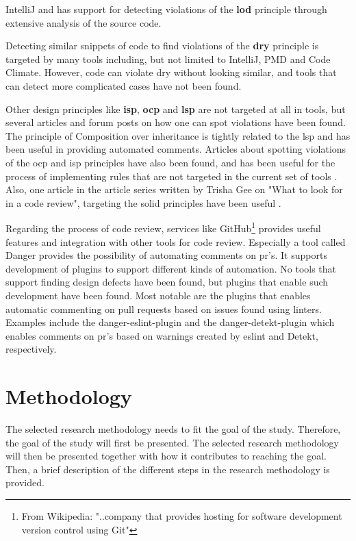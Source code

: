 \documentclass[pdftex,10pt,b5paper,twoside]{report}
\begin{document}
IntelliJ \cite{IntelliJ} and \cite{pmd} has support for detecting violations of the \textbf{\gls{lod}} principle through extensive analysis of the source code.

Detecting similar snippets of code to find violations of the \textbf{\gls{dry}} principle is targeted by many tools including, but not limited to IntelliJ\cite{IntelliJ}, PMD\cite{pmd} and Code Climate\cite{codeclimate}. However, code can violate \gls{dry} without looking similar, and tools that can detect more complicated cases have not been found.  

Other design principles like \textbf{\gls{isp}}, \textbf{\gls{ocp}} and \textbf{\gls{lsp}} are not targeted at all in tools, but several articles and forum posts on how one can spot violations have been found. The principle of Composition over inheritance is tightly related to the \gls{lsp} and \cite{composition-over-inheritance-stackoverflow} has been useful in providing automated comments. Articles about spotting violations of the \gls{ocp} and \gls{isp} principles have also been found, and has been useful for the process of implementing rules that are not targeted in the current set of tools \cite{ocp-violations} \cite{ocp2} \cite{isp-violation} \cite{ocp3}. Also, one article in the article series written by Trisha Gee on "What to look for in a code review", targeting the \gls{solid} principles have been useful \cite{whattolookforincodereview}.  

Regarding the process of code review, services like GitHub\cite{github}\footnote{From Wikipedia: "..company that provides hosting for software development version control using Git"\cite{github-wiki}} provides useful features and integration with other tools for code review. Especially a tool called Danger\cite{danger} provides the possibility of automating comments on \gls{pr}'s. It supports development of plugins to support different kinds of automation. No tools that support finding design defects have been found, but plugins that enable such development have been found. Most notable are the plugins that enables automatic commenting on pull requests based on issues found using linters. Examples include the danger-eslint-plugin\cite{danger-eslint-plugin} and the danger-detekt-plugin\cite{danger-detekt-plugin} which enables comments on \gls{pr}'s based on warnings created by eslint\cite{eslint} and Detekt\cite{detekt}, respectively. 
\cleardoublepage

\chapter{Methodology}
\label{methodology}
The selected research methodology needs to fit the goal of the study. Therefore, the goal of the study will first be presented. The selected research methodology will then be presented together with how it contributes to reaching the goal. Then, a brief description of the different steps in the research methodology is provided. 
\end{document}
